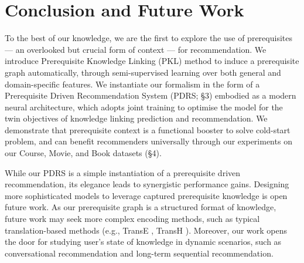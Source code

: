 \section{Conclusion and Future Work}

To the best of our knowledge, we are the first to explore the use of prerequisites --- an overlooked but crucial form of context --- for recommendation.
We introduce Prerequisite Knowledge Linking (PKL) method to induce a prerequisite graph automatically, through semi-supervised learning over both general and domain-specific features.
We instantiate our formalism in the form of a Prerequisite Driven Recommendation System (PDRS; \S3) embodied as a modern neural architecture, which adopts joint training to optimise the model for the twin objectives of knowledge linking prediction and recommendation.
We demonstrate that prerequisite context is a functional booster to solve cold-start problem, and can benefit recommenders universally through our experiments on our Course, Movie, and Book datasets (\S4).

While our PDRS is a simple instantiation of a prerequisite driven recommendation, its elegance leads to synergistic performance gains. Designing more sophisticated models to leverage captured prerequisite knowledge is open  future work. 
As our prerequisite graph is a structured format of knowledge, future work may seek more complex encoding methods, such as typical translation-based methods (e.g., TransE \cite{bordes2013translating}, TransH \cite{wang2014knowledge}).
Moreover, our work opens the door for studying user's state of knowledge in dynamic scenarios, such as conversational recommendation and long-term sequential recommendation.



